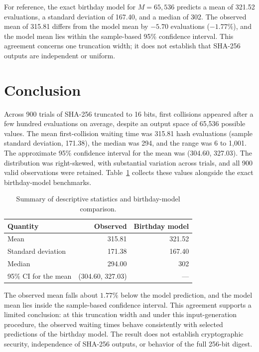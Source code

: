 \documentclass[12pt,letterpaper]{article}
\begin{document}
For reference, the exact birthday model for $M = 65{,}536$ predicts a mean of 321.52 evaluations, a standard deviation of 167.40, and a median of 302. The observed mean of 315.81 differs from the model mean by $-5.70$ evaluations ($-1.77\%$), and the model mean lies within the sample-based 95\% confidence interval. This agreement concerns one truncation width; it does not establish that SHA-256 outputs are independent or uniform.

\section{Conclusion}

Across 900 trials of SHA-256 truncated to 16 bits, first collisions appeared after a few hundred evaluations on average, despite an output space of 65{,}536 possible values. The mean first-collision waiting time was 315.81 hash evaluations (sample standard deviation, 171.38), the median was 294, and the range was 6 to 1{,}001. The approximate 95\% confidence interval for the mean was (304.60, 327.03). The distribution was right-skewed, with substantial variation across trials, and all 900 valid observations were retained. Table~\ref{tab:summary} collects these values alongside the exact birthday-model benchmarks.

\begin{table}[h]
\centering
\caption{Summary of descriptive statistics and birthday-model comparison.}
\label{tab:summary}
\begin{tabular}{lrr}
\toprule
Quantity                     & Observed          & Birthday model \\
\midrule
Mean                         & 315.81            & 321.52         \\
Standard deviation           & 171.38            & 167.40         \\
Median                       & 294.00            & 302            \\
95\% CI for the mean         & (304.60, 327.03)  & ---            \\
\bottomrule
\end{tabular}
\end{table}

The observed mean falls about $1.77\%$ below the model prediction, and the model mean lies inside the sample-based confidence interval. This agreement supports a limited conclusion: at this truncation width and under this input-generation procedure, the observed waiting times behave consistently with selected predictions of the birthday model. The result does not establish cryptographic security, independence of SHA-256 outputs, or behavior of the full 256-bit digest.
\end{document}
